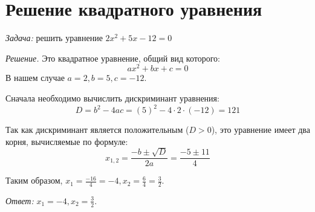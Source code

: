 \documentclass[12pt]{article}
\begin{document}
\section{Решение квадратного уравнения}
\textit{Задача:} решить уравнение $2x^2+5x-12=0$

\indent \textit{Решение.} Это квадратное уравнение, общий вид которого:
\[
ax^2+bx+c=0
\]
В нашем случае $a=2,b=5,c=-12$.

\indent Сначала необходимо вычислить дискриминант уравнения:
\[
D=b^2-4ac=(5)^2-4\cdot2\cdot(-12)=121
\]

Так как дискриминант является положительным ($D > 0$), это уравнение имеет два корня, вычисляемые по формуле:
\[
x_{1,2}=\frac{-b\pm\sqrt{D}}{2a}=\frac{-5\pm11}{4}
\]

Таким образом, $x_1=\frac{-16}{4}=-4, x_2=\frac{6}{4}=\frac{3}{2}.$

\textit{Ответ:} $x_1=-4,x_2=\frac{3}{2}.$
\end{document}
